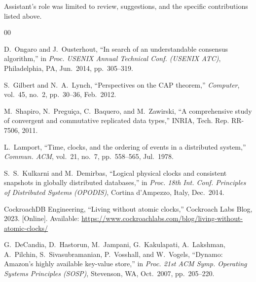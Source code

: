 \documentclass[conference]{IEEEtran}
\begin{document}
Assistant's role was limited to review, suggestions, and the specific contributions listed above.

\begin{thebibliography}{00}

  D.~Ongaro and J.~Ousterhout,
  ``In search of an understandable consensus algorithm,''
  in \emph{Proc. USENIX Annual Technical Conf. (USENIX ATC)},
  Philadelphia, PA, Jun.\ 2014, pp.\ 305--319.

  S.~Gilbert and N.~A.~Lynch,
  ``Perspectives on the CAP theorem,''
  \emph{Computer}, vol.~45, no.~2, pp.~30--36, Feb.\ 2012.

  M.~Shapiro, N.~Pregui\c{c}a, C.~Baquero, and M.~Zawirski,
  ``A comprehensive study of convergent and commutative replicated data types,''
  INRIA, Tech. Rep. RR-7506, 2011.

  L.~Lamport,
  ``Time, clocks, and the ordering of events in a distributed system,''
  \emph{Commun. ACM}, vol.~21, no.~7, pp.~558--565, Jul.\ 1978.

  S.~S.~Kulkarni and M.~Demirbas,
  ``Logical physical clocks and consistent snapshots in globally distributed
  databases,''
  in \emph{Proc. 18th Int. Conf. Principles of Distributed Systems (OPODIS)},
  Cortina d'Ampezzo, Italy, Dec.\ 2014.

  CockroachDB Engineering,
  ``Living without atomic clocks,''
  Cockroach Labs Blog, 2023.
  [Online]. Available: \url{https://www.cockroachlabs.com/blog/living-without-atomic-clocks/}

  G.~DeCandia, D.~Hastorun, M.~Jampani, G.~Kakulapati, A.~Lakshman,
  A.~Pilchin, S.~Sivasubramanian, P.~Vosshall, and W.~Vogels,
  ``Dynamo: Amazon's highly available key-value store,''
  in \emph{Proc. 21st ACM Symp. Operating Systems Principles (SOSP)},
  Stevenson, WA, Oct.\ 2007, pp.\ 205--220.

\end{thebibliography}
\end{document}
